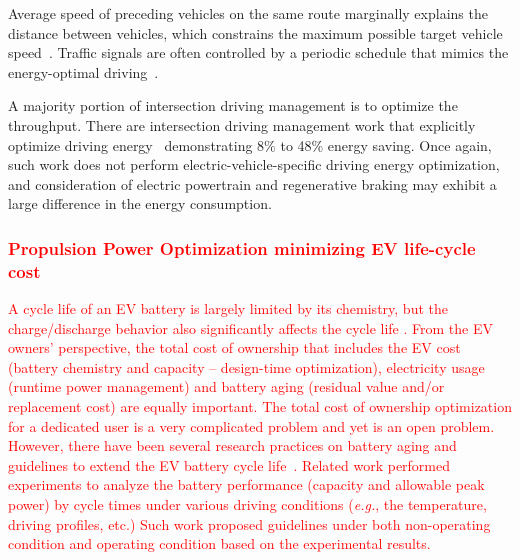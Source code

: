 Average speed of preceding vehicles on the same route marginally explains the distance between vehicles, which constrains the maximum possible target vehicle speed~\cite{Mensing:TR13,Lim:TVT17}. Traffic signals are often controlled by a periodic schedule that mimics the energy-optimal driving~\cite{Mandava:ITSC09,Asadi:TCST11,Ozatay:CDC13,Nunzio:JRNC15,Wu:ITS15}.

A majority portion of intersection driving management is to optimize the throughput. There are intersection driving management work that explicitly optimize driving energy~\cite{Nunzio:JRNC15,Wu:ITS15} demonstrating 8\% to 48\% energy saving. Once again, such work does not perform electric-vehicle-specific driving energy optimization, and consideration of electric powertrain and regenerative braking may exhibit a large difference in the energy consumption.
\textcolor{red}{
\subsubsection{Propulsion Power Optimization minimizing EV life-cycle cost} \label{subsubsec:opt_life_cycle}
A cycle life of an EV battery is largely limited by its chemistry, but the charge/discharge behavior also significantly affects the cycle life \cite{ZS_millner}. From the EV owners' perspective, the total cost of ownership that includes the EV cost (battery chemistry and capacity -- design-time optimization), electricity usage (runtime power management) and battery aging (residual value and/or replacement cost) are equally important. The total cost of ownership optimization for a dedicated user is a very complicated problem and yet is an open problem. 
%
However, there have been several research practices on battery aging and guidelines to extend the EV battery cycle life~\cite{Sarre:JPS04,Keil:PHD17}. Related work performed experiments to analyze the battery performance (capacity and allowable peak power) by cycle times under various driving conditions (\textit{e.g.}, the temperature, driving profiles, etc.) Such work proposed guidelines under both non-operating condition and operating condition based on the experimental results.}
